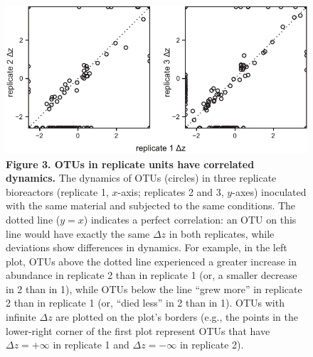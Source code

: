 \clearpage
\begin{figure}[ht]
\centering
\includegraphics{texmex/fig/fig_3}
\caption*{{\bf Figure 3. OTUs in replicate units have correlated dynamics.}
The dynamics of OTUs (circles) in three replicate bioreactors (replicate 1,
$x$-axis; replicates 2 and 3, $y$-axes) inoculated with the same material and
subjected to the same conditions. The dotted line ($y=x$) indicates a perfect
correlation: an OTU on this line would have exactly the same $\Delta z$ in both
replicates, while deviations show differences in dynamics. For example, in the
left plot, OTUs above the dotted line experienced a greater increase in
abundance in replicate 2 than in replicate 1 (or, a smaller decrease in 2 than
in 1), while OTUs below the line ``grew more'' in replicate 2 than in replicate 1
(or, ``died less'' in 2 than in 1). OTUs with infinite $\Delta z$ are plotted on the
plot's borders (e.g., the points in the lower-right corner of the first plot
represent OTUs that have $\Delta z = +\infty$ in replicate 1 and $\Delta z = -\infty$ in replicate 2).}
\end{figure}

